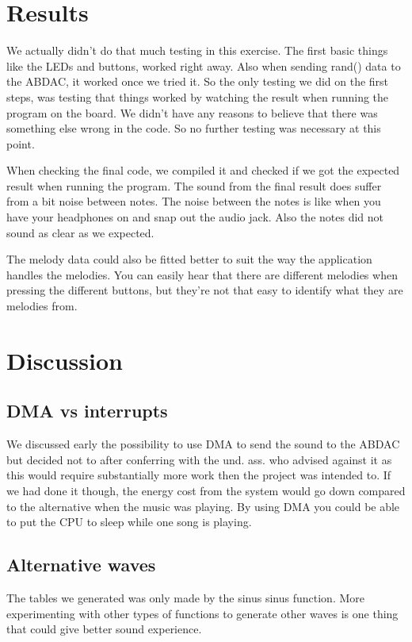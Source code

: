 \documentclass[12pt,a4paper,final]{report}
\numberwithin{equation}{section}
\numberwithin{table}{section}
\numberwithin{figure}{section}
\begin{document}
\section{Results}
\label{sec:results}

We actually didn't do that much testing in this exercise. The first basic things like the LEDs and buttons, worked right away. Also when sending rand() data to the ABDAC, it worked once we tried it. So the only testing we did on the first steps, was testing that things worked by watching the result when running the program on the board. We didn't have any reasons to believe that there was something else wrong in the code. So no further testing was necessary at this point.

When checking the final code, we compiled it and checked if we got the expected result when running the program. The sound from the final result does suffer from a bit noise between notes. The noise between the notes is like when you have your headphones on and snap out the audio jack. Also the notes did not sound as clear as we expected.

The melody data could also be fitted better to suit the way the application handles the melodies. You can easily hear that there are different melodies when pressing the different buttons, but they're not that easy to identify what they are melodies from. 

\newpage

\section{Discussion}
\label{sec:discussion}

\subsection{DMA vs interrupts}
\label{sec:dmainterrupt}
We discussed early the possibility to use DMA to send the sound to the ABDAC but decided not to after conferring with the und. ass. who advised against it as this would require substantially more work then the project was intended to. If we had done it though, the energy cost from the system would go down compared to the alternative when the music was playing. By using DMA you could be able to put the CPU to sleep while one song is playing. 

\subsection{Alternative waves}
\label{sec:alternativewaves}
The tables we generated was only made by the sinus sinus function. More experimenting with other types of functions to generate other waves is one thing that could give better sound experience. 
\end{document}
